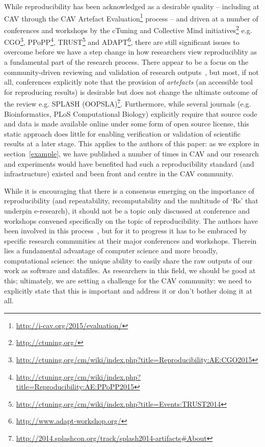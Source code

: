 \documentclass{llncs}
\begin{document}
While reproducibility has been acknowledged as a desirable quality --
including at CAV through the CAV Artefact
Evaluation\footnote{\url{http://i-cav.org/2015/evaluation/}} process
-- and driven at a number of conferences and workshops by the cTuning
and Collective Mind initiatives\footnote{\url{http://ctuning.org/}}
e.g. CGO\footnote{\url{http://ctuning.org/cm/wiki/index.php?title=Reproducibility:AE:CGO2015}},
PPoPP\footnote{\url{http://ctuning.org/cm/wiki/index.php?title=Reproducibility:AE:PPoPP2015}},
TRUST\footnote{\url{http://ctuning.org/cm/wiki/index.php?title=Events:TRUST2014}}
and ADAPT\footnote{\url{http://www.adapt-workshop.org/}}, there are
still significant issues to overcome before we have a step change in
how researchers view reproduciblity as a fundamental part of the
research process.  There appear to be a focus on the community-driven
reviewing and validation of research
outputs~\cite{fursin+dubach:2014}, but most, if not all, conferences
explicitly note that the provision of \emph{artefacts} (an accessible
tool for reproducing results) is desirable but does not change the
ultimate outcome of the review e.g. SPLASH
(OOPSLA)\footnote{\url{http://2014.splashcon.org/track/splash2014-artifacts\#About}}.
Furthermore, while several journals (e.g. Bioinformatics, PLoS
Computational Biology) explicitly require that source code and data is
made available online under some form of open source license, this
static approach does little for enabling verification or validation of
scientific results at a later stage. This applies to the authors of
this paper: as we explore in section~\ref{example}, we have published
a number of times in CAV and our research and experiments would have
benefited had such a reproducibility standard (and infrastructure)
existed and been front and centre in the CAV community.

While it is encouraging that there is a consensus emerging on the
importance of reproducibility (and repeatability, recomputability and
the multitude of `Rs' that underpin e-research), it should not be a
topic only discussed at conference and workshops convened specifically
on the topic of reproducibility. The authors have been involved in
this process~\cite{crick+chuehong:2014}, but for it to progress it has
to be embraced by specific research communities at their major
conferences and workshops. Therein lies a fundamental advantage of
computer science and more broadly, computational science: the unique
ability to easily share the raw outputs of our work as software and
datafiles. As researchers in this field, we should be good at this;
ultimately, we are setting a challenge for the CAV community: we need
to explicitly state that this is important and address it or don't
bother doing it at all.
\end{document}
